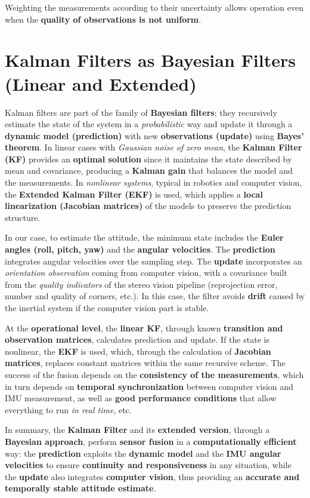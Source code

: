 Weighting the measurements according to their uncertainty allows operation even when the \textbf{quality of observations is not uniform}.  

\section[Kalman Filters as Bayesian Filters]{Kalman Filters as Bayesian Filters (Linear and Extended)}

Kalman filters are part of the family of \textbf{Bayesian filters}; they recursively estimate the state of the system in a \textit{probabilistic} way and update it through a \textbf{dynamic model (prediction)} with new \textbf{observations (update)} using \textbf{Bayes’ theorem}. In linear cases with \textit{Gaussian noise of zero mean}, the \textbf{Kalman Filter (KF)} provides an \textbf{optimal solution} since it maintains the state described by mean and covariance, producing a \textbf{Kalman gain} that balances the model and the measurements. In \textit{nonlinear systems}, typical in robotics and computer vision, the \textbf{Extended Kalman Filter (EKF)} is used, which applies a \textbf{local linearization (Jacobian matrices)} of the models to preserve the prediction structure.  

In our case, to estimate the attitude, the minimum state includes the \textbf{Euler angles (roll, pitch, yaw)} and the \textbf{angular velocities}. The \textbf{prediction} integrates angular velocities over the sampling step. The \textbf{update} incorporates an \textit{orientation observation} coming from computer vision, with a covariance built from the \textit{quality indicators} of the stereo vision pipeline (reprojection error, number and quality of corners, etc.). In this case, the filter avoids \textbf{drift} caused by the inertial system if the computer vision part is stable.  

At the \textbf{operational level}, the \textbf{linear KF}, through known \textbf{transition and observation matrices}, calculates prediction and update. If the state is nonlinear, the \textbf{EKF} is used, which, through the calculation of \textbf{Jacobian matrices}, replaces constant matrices within the same recursive scheme. The success of the fusion depends on the \textbf{consistency of the measurements}, which in turn depends on \textbf{temporal synchronization} between computer vision and IMU measurement, as well as \textbf{good performance conditions} that allow everything to run \textit{in real time}, etc.  

In summary, the \textbf{Kalman Filter} and its \textbf{extended version}, through a \textbf{Bayesian approach}, perform \textbf{sensor fusion} in a \textbf{computationally efficient} way: the \textbf{prediction} exploits the \textbf{dynamic model} and the \textbf{IMU angular velocities} to ensure \textbf{continuity and responsiveness} in any situation, while the \textbf{update} also integrates \textbf{computer vision}, thus providing an \textbf{accurate and temporally stable attitude estimate}.  